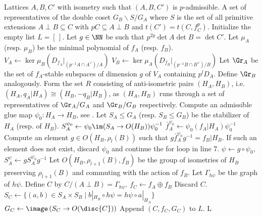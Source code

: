 \begingroup
{}\label{alg:extensions}
\endgroup
\begin{algorithmic}[1]
\REQUIRE Lattices $A,B,C'$ with isometry such that $(A,B,C')$ is $p$-admissible.
\ENSURE
  A set of representatives of the double coset $G_B \backslash S {/}G_A$ where
$S$ is the set of all primitive extensions $A\perp B\subseteq C$ with $pC \subseteq A \perp B$ and $t(C') = t(C,f_C^p)$.
\STATE Initialize the empty list $L = [\,]$.
\STATE Let $g \in \NN$ be such that $p^{2g}  \det A  \det B = \det C'$. \label{alg:extensions_g}
\STATE Let $\mu_A$ (resp. $\mu_B$)
be the minimal polynomial of $f_A$ (resp. $f_B$).
\STATE $V_A \gets \ker \mu_B(D_{f_A}|_{(p^{-1} A \cap A^\vee)/A})$
\STATE $V_B \gets \ker \mu_A(D_{f_B}|_{(p^{-1} B \cap B^\vee)/B})$
\STATE Let $\Gr_A$ be the set of $f_A$-stable subspaces of dimension $g$ of $V_A$ containing $p^l D_A$. Define $\Gr_B$ analogously.
Form the set $R$ consisting of anti-isometric pairs $(H_A,H_B)$, i.e.
$(H_A,q_A|H_A) \cong (H_B,-q_B|H_B)$,
as $(H_A,H_B)$ runs through a set of representatives of
  $\Gr_A/G_A$ and $\Gr_B/G_B$ respectively.
\label{HAHB}
  \STATE Compute an admissible glue map $\psi_0\colon H_A \to H_B$, see . \label{discard_psi1}
  \STATE Let $S_A\leq G_A$ (resp. $S_B \leq G_B$) be the stabilizer of $H_A$ (resp. of $H_B$).
  \STATE $S_A^{\psi_0}\gets \psi_0 \im(S_A\to O(H_B)) \psi_0^{-1}$
  \STATE $\bar f_A^{\psi_0} \gets \psi_0 (f_A|H_A)\psi_0^{-1}$
  \STATE Compute an element $g \in O(H_B,\rho_l(B))$ such that $g \bar f_A^{\psi_0} g^{-1} = f_B|H_B$. If such an element does not exist, discard $\psi_0$ and continue the for loop in line 7. \label{discard_psi2}
  \STATE $\psi \gets g \circ \psi_0$, $S_A^\psi \gets gS_A^{\psi_0}g^{-1}$
  \STATE Let $O(H_B,\rho_{l+1}(B),f_B)$ be the group of isometries of $H_B$ preserving $\rho_{l+1}(B)$ and  commuting with the action of $f_B$.
    \STATE Let $\Gamma_{h\psi}$ be the graph of $h\psi$.
    \STATE Define $C$ by $C/(A\perp B) = \Gamma_{h \psi}$.
    \STATE $f_C \gets f_A \oplus f_B$
      \label{keepC?}
      \STATE Discard $C$.
    \ENDIF
    \STATE $S_C \gets\{(a,b) \in S_A \times S_B \mid b|_{H_B} \circ h\psi = h\psi \circ a|_{H_A}\}$ \label{preserveC}
    \STATE $G_C \gets \image\left(S_C \rightarrow O(\disc{C})\right)$
    \STATE Append $(C,f_C,G_C)$ to $L$.
  \ENDFOR
\ENDFOR
\RETURN L
\end{algorithmic}\hrulefill\\

